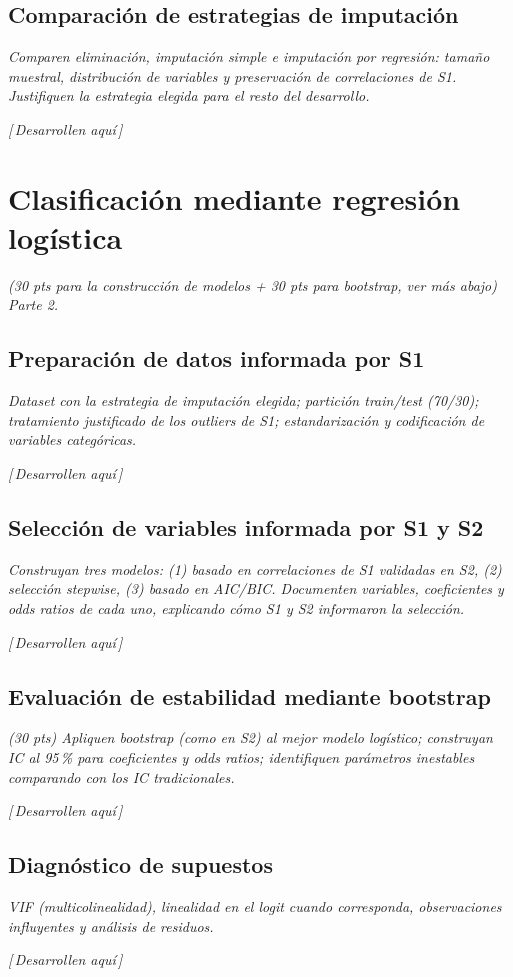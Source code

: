 \documentclass[11pt,a4paper]{article}
\newcommand{\guia}[1]{{\small\itshape\color{gris}#1}\par\vspace{0.15em}}
\newcommand{\resp}{{\footnotesize\itshape\color{fillgray}[\,Desarrollen aquí\,]}\par\vspace{1.1em}}
\begin{document}
\subsection{Comparación de estrategias de imputación}
\guia{Comparen eliminación, imputación simple e imputación por regresión: tamaño muestral, distribución de variables y preservación de correlaciones de S1. Justifiquen la estrategia elegida para el resto del desarrollo.}
\resp

\section{Clasificación mediante regresión logística}
\guia{(30 pts para la construcción de modelos + 30 pts para bootstrap, ver más abajo) Parte 2.}

\subsection{Preparación de datos informada por S1}
\guia{Dataset con la estrategia de imputación elegida; partición train/test (70/30); tratamiento justificado de los outliers de S1; estandarización y codificación de variables categóricas.}
\resp

\subsection{Selección de variables informada por S1 y S2}
\guia{Construyan tres modelos: (1) basado en correlaciones de S1 validadas en S2, (2) selección stepwise, (3) basado en AIC/BIC. Documenten variables, coeficientes y odds ratios de cada uno, explicando cómo S1 y S2 informaron la selección.}
\resp

\subsection{Evaluación de estabilidad mediante bootstrap}
\guia{(30 pts) Apliquen bootstrap (como en S2) al mejor modelo logístico; construyan IC al 95\,\% para coeficientes y odds ratios; identifiquen parámetros inestables comparando con los IC tradicionales.}
\resp

\subsection{Diagnóstico de supuestos}
\guia{VIF (multicolinealidad), linealidad en el logit cuando corresponda, observaciones influyentes y análisis de residuos.}
\resp
\end{document}
